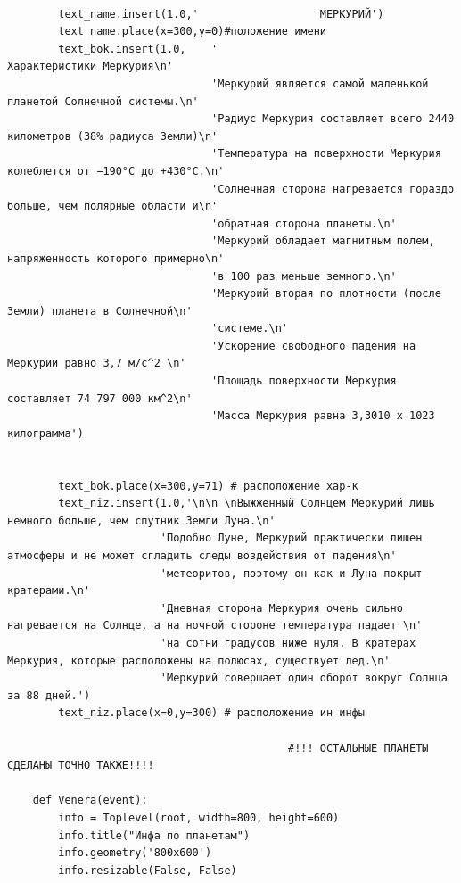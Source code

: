 \documentclass[11pt,a4paper]{report}
\begin{document}
\begin{verbatim}
       
        text_name.insert(1.0,'                   МЕРКУРИЙ')
        text_name.place(x=300,y=0)#положение имени
        text_bok.insert(1.0,    '                                           Характеристики Меркурия\n' 
                                'Меркурий является самой маленькой планетой Солнечной системы.\n'
                                'Радиус Меркурия составляет всего 2440 километров (38% радиуса Земли)\n'
                                'Температура на поверхности Меркурия колеблется от −190°C до +430°C.\n'
                                'Солнечная сторона нагревается гораздо больше, чем полярные области и\n'
                                'обратная сторона планеты.\n'
                                'Меркурий обладает магнитным полем, напряженность которого примерно\n' 
                                'в 100 раз меньше земного.\n'
                                'Меркурий вторая по плотности (после Земли) планета в Солнечной\n'
                                'системе.\n'
                                'Ускорение свободного падения на Меркурии равно 3,7 м/c^2 \n'
                                'Площадь поверхности Меркурия составляет 74 797 000 км^2\n' 
                                'Масса Меркурия равна 3,3010 х 1023 килограмма')
        
        
        text_bok.place(x=300,y=71) # расположение хар-к        
        text_niz.insert(1.0,'\n\n \nВыжженный Солнцем Меркурий лишь немного больше, чем спутник Земли Луна.\n'
                        'Подобно Луне, Меркурий практически лишен атмосферы и не может сгладить следы воздействия от падения\n' 
                        'метеоритов, поэтому он как и Луна покрыт кратерами.\n'
                        'Дневная сторона Меркурия очень сильно нагревается на Солнце, а на ночной стороне температура падает \n'
                        'на сотни градусов ниже нуля. В кратерах Меркурия, которые расположены на полюсах, существует лед.\n'
                        'Меркурий совершает один оборот вокруг Солнца за 88 дней.')
        text_niz.place(x=0,y=300) # расположение ин инфы  
                                              
                                            #!!! ОСТАЛЬНЫЕ ПЛАНЕТЫ СДЕЛАНЫ ТОЧНО ТАКЖЕ!!!!
        
    def Venera(event):  
        info = Toplevel(root, width=800, height=600)
        info.title("Инфа по планетам")
        info.geometry('800x600')
        info.resizable(False, False)  
        
    
        

\end{verbatim}
\end{document}
